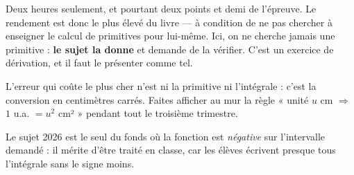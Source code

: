 \begin{notepourlaclasse}
Deux heures seulement, et pourtant deux points et demi de l'épreuve. Le
rendement est donc le plus élevé du livre — à condition de ne pas chercher à
enseigner le calcul de primitives pour lui-même. Ici, on ne cherche jamais
une primitive : \textbf{le sujet la donne} et demande de la vérifier. C'est
un exercice de dérivation, et il faut le présenter comme tel.

L'erreur qui coûte le plus cher n'est ni la primitive ni l'intégrale : c'est
la conversion en centimètres carrés. Faites afficher au mur la règle
« unité $u$ cm $\Rightarrow$ $1$ u.a. $= u^{2}$ cm² » pendant tout le
troisième trimestre.

Le sujet 2026 est le seul du fonds où la fonction est \emph{négative} sur
l'intervalle demandé : il mérite d'être traité en classe, car les élèves
écrivent presque tous l'intégrale sans le signe moins.
\end{notepourlaclasse}
